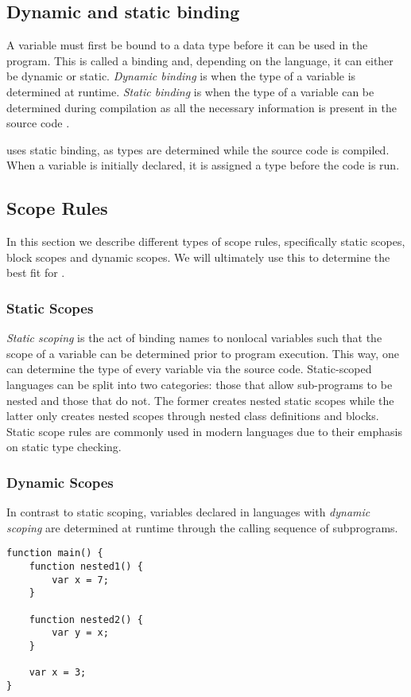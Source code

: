 \subsection*{Dynamic and static binding}
A variable must first be bound to a data type before it can be used in the program. 
This is called a binding and, depending on the language, it can either be dynamic or static.
\textit{Dynamic binding} is when the type of a variable is determined at runtime. 
\textit{Static binding} is when the type of a variable can be determined during compilation as all the necessary information is present in the source code \cite{sebesta_concepts_2016}.

\dazel{} uses static binding, as types are determined while the source code is compiled. When a variable is initially declared, it is assigned a type before the code is run.

\subsection{Scope Rules}
In this section we describe different types of scope rules, specifically static scopes, block scopes and dynamic scopes.
We will ultimately use this to determine the best fit for \dazel{}.

\subsubsection{Static Scopes}
\textit{Static scoping} is the act of binding names to nonlocal variables such that the scope of a variable
can be determined prior to program execution. This way, one can determine the type of every variable via the source code.
Static-scoped languages can be split into two categories: those that allow sub-programs to be nested and those that do not.
The former creates nested static scopes while the latter only creates nested scopes through nested class definitions and blocks.
Static scope rules are commonly used in modern languages due to their emphasis on static type checking\cite{sebesta_concepts_2016}.

\subsubsection{Dynamic Scopes}
In contrast to static scoping, variables declared in languages with \textit{dynamic scoping} are determined at runtime through the calling sequence of subprograms.

\begin{lstlisting}[language=CSharp, caption={Example of dynamic scoping}, label={lst:DynamicScopeExample}]
function main() {
	function nested1() {
		var x = 7;
	}
	
	function nested2() {
		var y = x;
	}

	var x = 3; 
}
\end{lstlisting}

